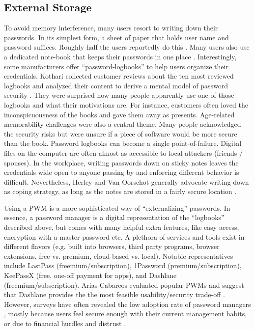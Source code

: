 	\subsection{External Storage}\label{sec:rw:external-storage}
	To avoid memory interference, many users resort to writing down their passwords. In its simplest form, a sheet of paper that holds user name and password suffices. Roughly half the users reportedly do this \cite{Olmstead2017AmerciansCybersecurity}. Many users also use a dedicated note-book that keeps their passwords in one place \cite{Kothari2017PasswordLogbooks}. Interestingly, some manufacturers offer ``password-logbooks'' to help users organize their credentials. Kothari \etal collected customer reviews about the ten most reviewed logbooks and analyzed their content to derive a mental model of password security \cite{Kothari2017PasswordLogbooks}. They were surprised how many people apparently use one of those logbooks and what their motivations are. For instance, customers often loved the inconspicuousness of the books and gave them away as presents. Age-related memorability challenges were also a central theme. Many people acknowledged the security risks but were unsure if a piece of software would be more secure than the book. Password logbooks can become a single point-of-failure. Digital files on the computer are often almost as accessible to local attackers (friends / spouses). In the workplace, writing passwords down on sticky notes \cite{Conklin2004PWAuthenticationSystemPerspective} leaves the credentials wide open to anyone passing by and enforcing different behavior is difficult. Nevertheless, Herley and Van Oorschot generally advocate writing down as coping strategy, as long as the notes are stored in a fairly secure location \cite{Herley2012PersistenceOfPasswords}.  

	Using a \gls{PWM} is a more sophisticated way of ``externalizing'' passwords. In essence, a password manager is a digital representation of the ``logbooks'' described above, but comes with many helpful extra features, like easy access, encryption with a master password etc. A plethora of services and tools exist in different flavors (e.g. built into browsers, third party programs, browser extensions, free vs. premium, cloud-based vs. local). Notable representatives include LastPass (freemium/subscription), 1Password (premium/subscription), KeePassX (free, one-off payment for apps), and Dashlane (freemium/subscription). Arias-Cabarcos \etal evaluated popular PWMs and suggest that Dashlane provides the the most feasible usability/security trade-off \cite{AriasCabarcos2016ComparingPWM}. However, surveys have often revealed the low adoption rate of password managers \cite{Olmstead2017AmerciansCybersecurity}, mostly because users feel secure enough with their current management habits, or due to financial hurdles and distrust \cite{CSID2012PasswordHabits,Fagan2017UsersConsiderationsPWMs}. 
	
